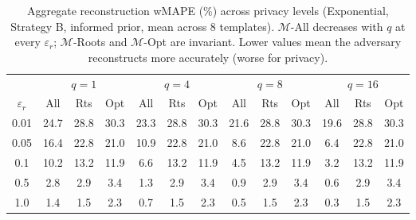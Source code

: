 \begin{table}[h]
\centering
\setlength{\tabcolsep}{2.5pt}
\small
\caption{Aggregate reconstruction wMAPE (\%) across privacy levels (Exponential, Strategy B, informed prior, mean across 8 templates). $\mathcal{M}$-All decreases with $q$ at every $\varepsilon_r$; $\mathcal{M}$-Roots and $\mathcal{M}$-Opt are invariant. Lower values mean the adversary reconstructs more accurately (worse for privacy).}
\label{tab:recon_main}
\begin{tabular}{c|ccc|ccc|ccc|ccc}
\toprule
 & \multicolumn{3}{c|}{$q=1$} & \multicolumn{3}{c|}{$q=4$} & \multicolumn{3}{c|}{$q=8$} & \multicolumn{3}{c}{$q=16$} \\
$\varepsilon_r$ & All & Rts & Opt & All & Rts & Opt & All & Rts & Opt & All & Rts & Opt \\
\midrule
0.01 & 24.7 & 28.8 & 30.3 & 23.3 & 28.8 & 30.3 & 21.6 & 28.8 & 30.3 & 19.6 & 28.8 & 30.3 \\
0.05 & 16.4 & 22.8 & 21.0 & 10.9 & 22.8 & 21.0 & 8.6 & 22.8 & 21.0 & 6.4 & 22.8 & 21.0 \\
0.1 & 10.2 & 13.2 & 11.9 & 6.6 & 13.2 & 11.9 & 4.5 & 13.2 & 11.9 & 3.2 & 13.2 & 11.9 \\
0.5 & 2.8 & 2.9 & 3.4 & 1.3 & 2.9 & 3.4 & 0.9 & 2.9 & 3.4 & 0.6 & 2.9 & 3.4 \\
1.0 & 1.4 & 1.5 & 2.3 & 0.7 & 1.5 & 2.3 & 0.5 & 1.5 & 2.3 & 0.3 & 1.5 & 2.3 \\
\bottomrule
\end{tabular}
\end{table}
